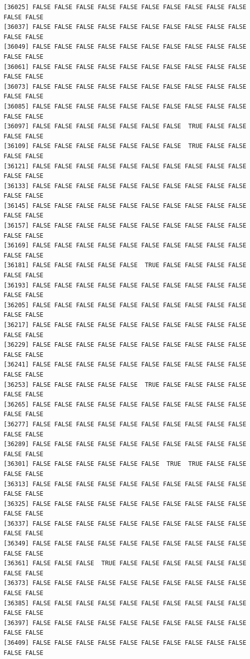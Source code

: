 \documentclass[
  a4paper,
  DIV=11,
  numbers=noendperiod]{scrartcl}
\begin{document}
\begin{verbatim}
[36025] FALSE FALSE FALSE FALSE FALSE FALSE FALSE FALSE FALSE FALSE FALSE FALSE
[36037] FALSE FALSE FALSE FALSE FALSE FALSE FALSE FALSE FALSE FALSE FALSE FALSE
[36049] FALSE FALSE FALSE FALSE FALSE FALSE FALSE FALSE FALSE FALSE FALSE FALSE
[36061] FALSE FALSE FALSE FALSE FALSE FALSE FALSE FALSE FALSE FALSE FALSE FALSE
[36073] FALSE FALSE FALSE FALSE FALSE FALSE FALSE FALSE FALSE FALSE FALSE FALSE
[36085] FALSE FALSE FALSE FALSE FALSE FALSE FALSE FALSE FALSE FALSE FALSE FALSE
[36097] FALSE FALSE FALSE FALSE FALSE FALSE FALSE  TRUE FALSE FALSE FALSE FALSE
[36109] FALSE FALSE FALSE FALSE FALSE FALSE FALSE  TRUE FALSE FALSE FALSE FALSE
[36121] FALSE FALSE FALSE FALSE FALSE FALSE FALSE FALSE FALSE FALSE FALSE FALSE
[36133] FALSE FALSE FALSE FALSE FALSE FALSE FALSE FALSE FALSE FALSE FALSE FALSE
[36145] FALSE FALSE FALSE FALSE FALSE FALSE FALSE FALSE FALSE FALSE FALSE FALSE
[36157] FALSE FALSE FALSE FALSE FALSE FALSE FALSE FALSE FALSE FALSE FALSE FALSE
[36169] FALSE FALSE FALSE FALSE FALSE FALSE FALSE FALSE FALSE FALSE FALSE FALSE
[36181] FALSE FALSE FALSE FALSE FALSE  TRUE FALSE FALSE FALSE FALSE FALSE FALSE
[36193] FALSE FALSE FALSE FALSE FALSE FALSE FALSE FALSE FALSE FALSE FALSE FALSE
[36205] FALSE FALSE FALSE FALSE FALSE FALSE FALSE FALSE FALSE FALSE FALSE FALSE
[36217] FALSE FALSE FALSE FALSE FALSE FALSE FALSE FALSE FALSE FALSE FALSE FALSE
[36229] FALSE FALSE FALSE FALSE FALSE FALSE FALSE FALSE FALSE FALSE FALSE FALSE
[36241] FALSE FALSE FALSE FALSE FALSE FALSE FALSE FALSE FALSE FALSE FALSE FALSE
[36253] FALSE FALSE FALSE FALSE FALSE  TRUE FALSE FALSE FALSE FALSE FALSE FALSE
[36265] FALSE FALSE FALSE FALSE FALSE FALSE FALSE FALSE FALSE FALSE FALSE FALSE
[36277] FALSE FALSE FALSE FALSE FALSE FALSE FALSE FALSE FALSE FALSE FALSE FALSE
[36289] FALSE FALSE FALSE FALSE FALSE FALSE FALSE FALSE FALSE FALSE FALSE FALSE
[36301] FALSE FALSE FALSE FALSE FALSE FALSE  TRUE  TRUE FALSE FALSE FALSE FALSE
[36313] FALSE FALSE FALSE FALSE FALSE FALSE FALSE FALSE FALSE FALSE FALSE FALSE
[36325] FALSE FALSE FALSE FALSE FALSE FALSE FALSE FALSE FALSE FALSE FALSE FALSE
[36337] FALSE FALSE FALSE FALSE FALSE FALSE FALSE FALSE FALSE FALSE FALSE FALSE
[36349] FALSE FALSE FALSE FALSE FALSE FALSE FALSE FALSE FALSE FALSE FALSE FALSE
[36361] FALSE FALSE FALSE  TRUE FALSE FALSE FALSE FALSE FALSE FALSE FALSE FALSE
[36373] FALSE FALSE FALSE FALSE FALSE FALSE FALSE FALSE FALSE FALSE FALSE FALSE
[36385] FALSE FALSE FALSE FALSE FALSE FALSE FALSE FALSE FALSE FALSE FALSE FALSE
[36397] FALSE FALSE FALSE FALSE FALSE FALSE FALSE FALSE FALSE FALSE FALSE FALSE
[36409] FALSE FALSE FALSE FALSE FALSE FALSE FALSE FALSE FALSE FALSE FALSE FALSE

\end{verbatim}
\end{document}

